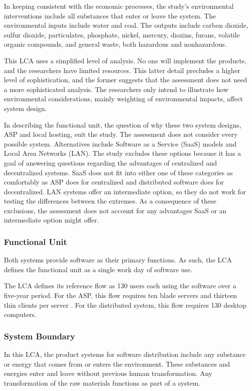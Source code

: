\documentclass[final,journal,10pt,letterpaper,oneside,twocolumn,compsoc]%
{IEEEtran}
\begin{document}
In keeping consistent with the economic processes, the study's environmental
interventions
include all substances that enter or leave the system. The environmental inputs
include water and coal. The outputs include carbon dioxide, sulfur dioxide,
particulates, phosphate, nickel, mercury, dioxins, furans, volatile organic
compounds, and general waste, both hazardous and nonhazardous.

This LCA uses a simplified level of analysis. No one will implement the
products, and the researchers have limited resources. This latter detail
precludes
a higher level of sophistication, and the former suggests that the
assessment does not need a more sophisticated analysis. The researchers only
intend to illustrate how environmental considerations, mainly weighting of
environmental impacts, affect system design.

In describing the functional unit, the question of why these two system designs,
ASP and local hosting, suit the study. The assessment does not consider
every possible system. Alternatives include
Software as a Service (SaaS) models and Local Area Networks (LAN). The study
excludes
these options because it has a goal of answering questions regarding the
advantages of
centralized and decentralized systems. SaaS does not fit into either one of
these categories as comfortably as ASP does for centralized and distributed
software does for decentralized. LAN systems offer an intermediate option, so
they do not work for testing the differences between the extremes. As a
consequence
of these exclusions, the assessment does not account for any advantages SaaS or
an intermediate option might offer.

\subsubsection{Functional Unit}
Both systems provide software as their primary functions.  As such, the LCA
defines the functional unit as a single work day of software use.

The LCA defines its reference flow as 130 users each using
the software over a five-year period. For the ASP,
this flow requires ten blade servers and thirteen thin clients per server
\cite{client}.
For the distributed system, this flow requires 130 desktop computers.

\subsubsection{System Boundary}
In this LCA, the product systems for software distribution
include any substance or energy that comes from or enters the
environment. These substances and energies enter and leave without previous
human transformation. Any transformation of the raw materials functions as part
of a system.
\end{document}
